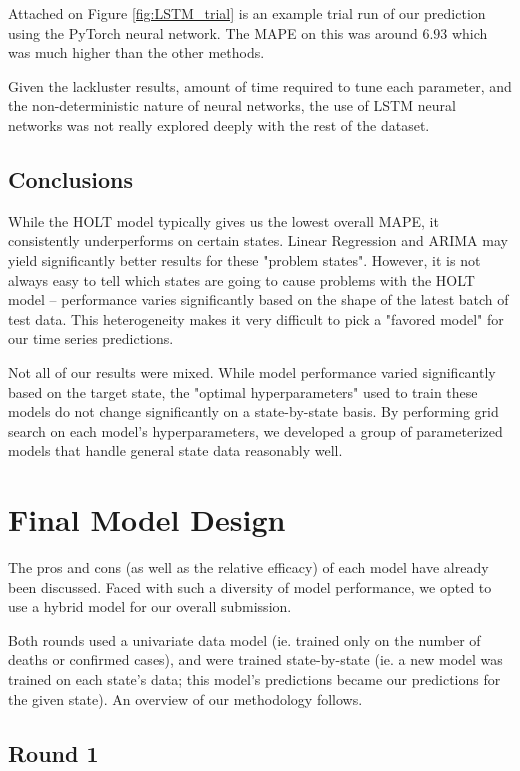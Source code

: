 \documentclass[sigconf,nonacm]{acmart}
\begin{document}
Attached on Figure  \ref{fig:LSTM_trial} is an example trial run of our
prediction using the PyTorch neural network. The MAPE on this was around $6.93$
which was much higher than the other methods.

Given the lackluster results, amount of time required to tune each parameter,
and the non-deterministic nature of neural networks, the use of LSTM neural
networks was not really explored deeply with the rest of the dataset.

\subsection{Conclusions}

While the HOLT model typically gives us the lowest overall MAPE, it
consistently underperforms on certain states. Linear Regression and ARIMA may
yield significantly better results for these "problem states". However, it is
not always easy to tell which states are going to cause problems with the HOLT
model -- performance varies significantly based on the shape of the latest
batch of test data. This heterogeneity makes it very difficult to pick a
"favored model" for our time series predictions. 

Not all of our results were mixed. While model performance varied significantly
based on the target state, the "optimal hyperparameters" used to train these
models do not change significantly on a state-by-state basis. By performing
grid search on each model's hyperparameters, we developed a group of
parameterized models that handle general state data reasonably well. 


\section{Final Model Design}

The pros and cons (as well as the relative efficacy) of each model have already
been discussed. Faced with such a diversity of model performance, we opted to
use a hybrid model for our overall submission. 

Both rounds used a univariate data model (ie. trained only on the number of
deaths or confirmed cases), and were trained state-by-state (ie. a new model
was trained on each state's data; this model's predictions became our
predictions for the given state). An overview of our methodology follows. 

\subsection{Round 1}
\end{document}
